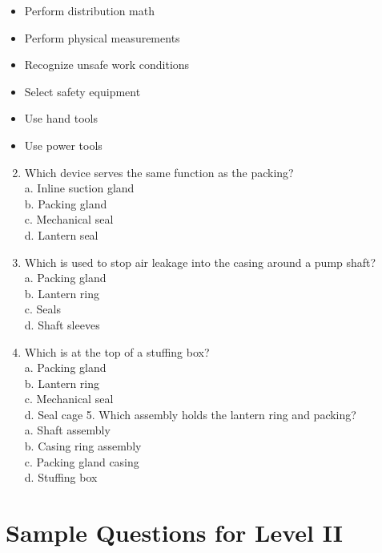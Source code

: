 \documentclass[10pt]{article}
\begin{document}
\begin{itemize}
  \item Perform distribution math

  \item Perform physical measurements

  \item Recognize unsafe work conditions

  \item Select safety equipment

  \item Use hand tools

  \item Use power tools

\end{itemize}

\begin{enumerate}
  \setcounter{enumi}{1}
  \item Which device serves the same function as the packing?\\
a. Inline suction gland\\
b. Packing gland\\
c. Mechanical seal\\
d. Lantern seal

  \item Which is used to stop air leakage into the casing around a pump shaft?\\
a. Packing gland\\
b. Lantern ring\\
c. Seals\\
d. Shaft sleeves

  \item Which is at the top of a stuffing box?\\
a. Packing gland\\
b. Lantern ring\\
c. Mechanical seal\\
d. Seal cage 5. Which assembly holds the lantern ring and packing?\\
a. Shaft assembly\\
b. Casing ring assembly\\
c. Packing gland casing\\
d. Stuffing box

\end{enumerate}

\section{Sample Questions for Level II}
\end{document}
